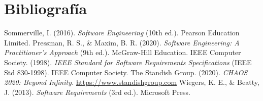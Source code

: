 \section*{Bibliografía}

\begin{thebibliography}{9}
Sommerville, I. (2016).
\textit{Software Engineering} (10th ed.).
Pearson Education Limited.
Pressman, R. S., \& Maxim, B. R. (2020).
\textit{Software Engineering: A Practitioner's Approach} (9th ed.).
McGraw-Hill Education.
IEEE Computer Society. (1998).
\textit{IEEE Standard for Software Requirements Specifications} (IEEE Std 830-1998).
IEEE Computer Society.
The Standish Group. (2020).
\textit{CHAOS 2020: Beyond Infinity.}
\url{https://www.standishgroup.com}
Wiegers, K. E., \& Beatty, J. (2013).
\textit{Software Requirements} (3rd ed.).
Microsoft Press.
\end{thebibliography}